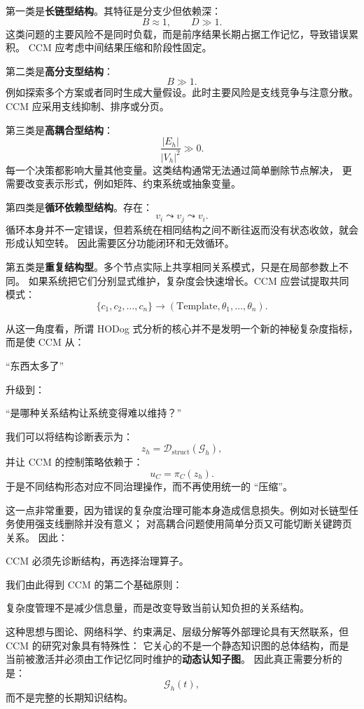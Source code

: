 第一类是\textbf{长链型结构}。其特征是分支少但依赖深：
\[
B\approx1,
\qquad
D\gg1.
\]
这类问题的主要风险不是同时负载，而是前序结果长期占据工作记忆，导致错误累积。
CCM 应考虑中间结果压缩和阶段性固定。

第二类是\textbf{高分支型结构}：
\[
B\gg1.
\]
例如探索多个方案或者同时生成大量假设。此时主要风险是支线竞争与注意分散。
CCM 应采用支线抑制、排序或分页。

第三类是\textbf{高耦合型结构}：
\[
\frac{|E_h|}{|V_h|^2}
\gg0.
\]
每一个决策都影响大量其他变量。这类结构通常无法通过简单删除节点解决，
更需要改变表示形式，例如矩阵、约束系统或抽象变量。

第四类是\textbf{循环依赖型结构}。存在：
\[
v_i\leadsto v_j
\leadsto v_i.
\]
循环本身并不一定错误，但若系统在相同结构之间不断往返而没有状态收敛，就会形成认知空转。
因此需要区分功能闭环和无效循环。

第五类是\textbf{重复结构型}。多个节点实际上共享相同关系模式，只是在局部参数上不同。
如果系统把它们分别显式维护，复杂度会快速增长。CCM 应尝试提取共同模式：
\[
\{c_1,c_2,\ldots,c_n\}
\longrightarrow
(\mathrm{Template},\theta_1,\ldots,\theta_n).
\]

从这一角度看，所谓 HODog 式分析的核心并不是发明一个新的神秘复杂度指标，而是使 CCM 从：
\begin{statementbox}
``东西太多了''
\end{statementbox}
升级到：
\begin{statementbox}
``是哪种关系结构让系统变得难以维持？''
\end{statementbox}

我们可以将结构诊断表示为：
\[
z_h
=
\mathcal D_{\mathrm{struct}}(\mathcal G_h),
\]
并让 CCM 的控制策略依赖于：
\[
u_C
=
\pi_C(z_h).
\]
于是不同结构形态对应不同治理操作，而不再使用统一的 ``压缩''。

这一点非常重要，因为错误的复杂度治理可能本身造成信息损失。例如对长链型任务使用强支线删除并没有意义；
对高耦合问题使用简单分页又可能切断关键跨页关系。
因此：
\begin{statementbox}
CCM 必须先诊断结构，再选择治理算子。
\end{statementbox}

我们由此得到 CCM 的第二个基础原则：
\begin{proposition*}
复杂度管理不是减少信息量，而是改变导致当前认知负担的关系结构。
\end{proposition*}

这种思想与图论、网络科学、约束满足、层级分解等外部理论具有天然联系，但 CCM 的研究对象具有特殊性：
它关心的不是一个静态知识图的总体结构，而是当前被激活并必须由工作记忆同时维护的\textbf{动态认知子图}。
因此真正需要分析的是：
\[
\mathcal G_h(t),
\]
而不是完整的长期知识结构。


